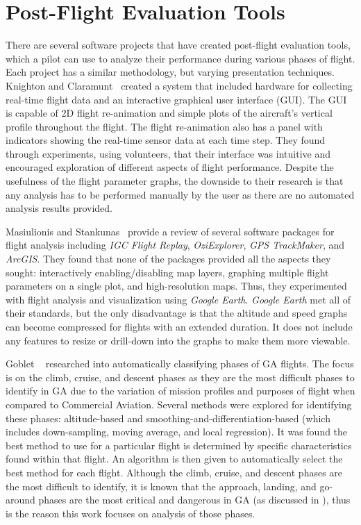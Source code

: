 \section{Post-Flight Evaluation Tools}

	There are several software projects that have created post-flight evaluation tools, which a pilot can use to analyze their performance during various phases of flight.  Each project has a similar methodology, but varying presentation techniques.  Knighton and Claramunt~\cite{knighton2001an-aeronautical} created a system that included hardware for collecting real-time flight data and an interactive graphical user interface (GUI).  The GUI is capable of 2D flight re-animation and simple plots of the aircraft's vertical profile throughout the flight.  The flight re-animation also has a panel with indicators showing the real-time sensor data at each time step.  They found through experiments, using volunteers, that their interface was intuitive and encouraged exploration of different aspects of flight performance.  Despite the usefulness of the flight parameter graphs, the downside to their research is that any analysis has to be performed manually by the user as there are no automated analysis results provided.
    
    Masiulionis and Stankunas~\cite{masiulionis2017review} provide a review of several software packages for flight analysis including \textit{IGC Flight Replay}, \textit{OziExplorer}, \textit{GPS TrackMaker}, and \textit{ArcGIS}.  They found that none of the packages provided all the aspects they sought:  interactively enabling/disabling map layers, graphing multiple flight parameters on a single plot, and high-resolution maps.  Thus, they experimented with flight analysis and visualization using \textit{Google Earth}.  \textit{Google Earth} met all of their standards, but the only disadvantage is that the altitude and speed graphs can become compressed for flights with an extended duration.  It does not include any features to resize or drill-down into the graphs to make them more viewable.
    
    Goblet \etal~\cite{goblet2016phase,goblet2015identifying} researched into automatically classifying phases of GA flights.  The focus is on the climb, cruise, and descent phases as they are the most difficult phases to identify in GA due to the variation of mission profiles and purposes of flight when compared to Commercial Aviation. Several methods were explored for identifying these phases:  altitude-based and smoothing-and-differentiation-based (which includes down-sampling, moving average, and local regression).  It was found the best method to use for a particular flight is determined by specific characteristics found within that flight.  An algorithm is then given to automatically select the best method for each flight.  Although the climb, cruise, and descent phases are the most difficult to identify, it is known that the approach, landing, and go-around phases are the most critical and dangerous in GA (as discussed in ), thus is the reason this work focuses on analysis of those phases. 
    
